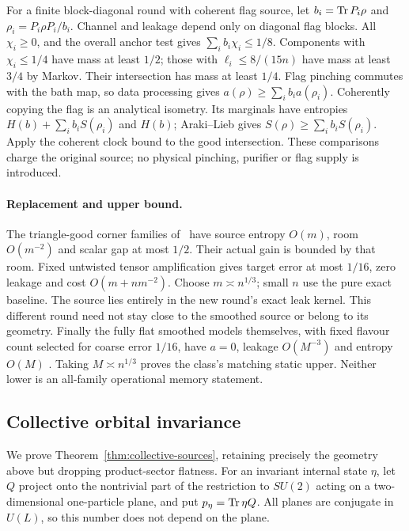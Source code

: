 For a finite block-diagonal round with coherent flag source, let
$b_i=\operatorname{Tr} P_i\rho$ and $\rho_i=P_i\rho P_i/b_i$.
Channel and leakage depend only on diagonal flag blocks.
All $\chi_i\geq0$, and the overall anchor test gives
$\sum_ib_i\chi_i\leq1/8$. Components with $\chi_i\leq1/4$
have mass at least $1/2$; those with $\ell_i\leq8/(15n)$ have
mass at least $3/4$ by Markov. Their intersection has mass at least
$1/4$. Flag pinching commutes with the bath map, so data processing
gives $a(\rho)\geq\sum_ib_i a(\rho_i)$.
Coherently copying the flag is an analytical isometry. Its marginals
have entropies $H(b)+\sum_ib_iS(\rho_i)$ and $H(b)$;
Araki--Lieb gives $S(\rho)\geq\sum_ib_iS(\rho_i)$.
Apply the coherent clock bound to the good intersection. These
comparisons charge the original source; no physical pinching,
purifier or flag supply is introduced.

\paragraph{Replacement and upper bound.}
The triangle-good corner families of~\cite[Proposition~4.10]{DouglasMghirbiB} have
source entropy $O(m)$, room $O(m^{-2})$ and scalar gap at most $1/2$.
Their actual gain is bounded by that room. Fixed untwisted tensor
amplification gives target error at most $1/16$, zero leakage and
cost $O(m+nm^{-2})$. Choose $m\asymp n^{1/3}$; small $n$ use the
pure exact baseline. The source lies entirely in the new round's
exact leak kernel. This different round need not stay close to the
smoothed source or belong to its geometry.
Finally the fully flat smoothed models themselves, with fixed flavour
count selected for coarse error $1/16$, have $a=0$, leakage
$O(M^{-3})$ and entropy $O(M)$
\cite[Proposition~4.14]{DouglasMghirbiB}.
Taking $M\asymp n^{1/3}$ proves the class's matching static upper.
Neither lower is an all-family operational memory statement.

\subsection{Collective orbital invariance}

We prove Theorem~\ref{thm:collective-sources}, retaining precisely the
geometry above but dropping product-sector flatness. For an invariant
internal state $\eta$, let $Q$ project onto the nontrivial part of the
restriction to $SU(2)$ acting on a two-dimensional one-particle plane,
and put $p_\eta=\operatorname{Tr}\eta Q$. All planes are conjugate in $U(L)$,
so this number does not depend on the plane.

